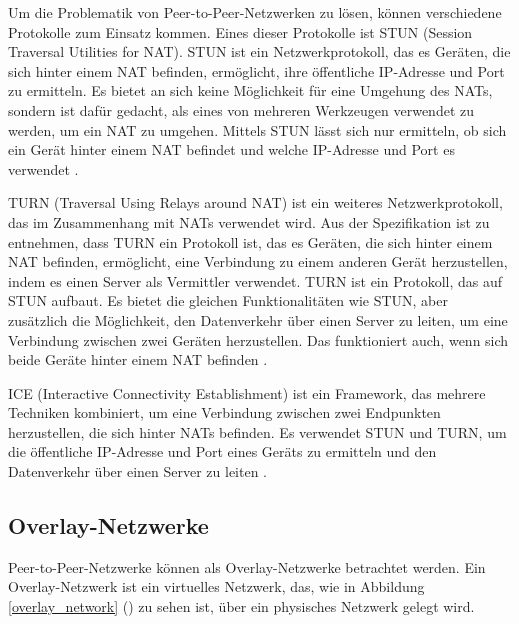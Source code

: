 Um die Problematik von Peer-to-Peer-Netzwerken zu lösen, können verschiedene Protokolle zum Einsatz kommen. Eines dieser Protokolle ist STUN (Session Traversal Utilities for NAT). STUN ist ein Netzwerkprotokoll, das es Geräten, die sich hinter einem NAT befinden, ermöglicht, ihre öffentliche IP-Adresse und Port zu ermitteln. Es bietet an sich keine Möglichkeit für eine Umgehung des NATs, sondern ist dafür gedacht, als eines von mehreren Werkzeugen verwendet zu werden, um ein NAT zu umgehen. Mittels STUN lässt sich nur ermitteln, ob sich ein Gerät hinter einem NAT befindet und welche IP-Adresse und Port es verwendet \parencite[S. 4]{rfc8489_STUN}.

TURN (Traversal Using Relays around NAT) ist ein weiteres Netzwerkprotokoll, das im Zusammenhang mit NATs verwendet wird. Aus der Spezifikation ist zu entnehmen, dass TURN ein Protokoll ist, das es Geräten, die sich hinter einem NAT befinden, ermöglicht, eine Verbindung zu einem anderen Gerät herzustellen, indem es einen Server als Vermittler verwendet. TURN ist ein Protokoll, das auf STUN aufbaut. Es bietet die gleichen Funktionalitäten wie STUN, aber zusätzlich die Möglichkeit, den Datenverkehr über einen Server zu leiten, um eine Verbindung zwischen zwei Geräten herzustellen. Das funktioniert auch, wenn sich beide Geräte hinter einem NAT befinden \parencite[S. 7]{rfc8656_TURN}.

ICE (Interactive Connectivity Establishment) ist ein Framework, das mehrere Techniken kombiniert, um eine Verbindung zwischen zwei Endpunkten herzustellen, die sich hinter NATs befinden. Es verwendet STUN und TURN, um die öffentliche IP-Adresse und Port eines Geräts zu ermitteln und den Datenverkehr über einen Server zu leiten \Parencite[S. 6]{rfc8445_ICE}.


\subsection{Overlay-Netzwerke}

Peer-to-Peer-Netzwerke können als Overlay-Netzwerke betrachtet werden. Ein Overlay-Netzwerk ist ein virtuelles Netzwerk, das, wie in Abbildung \ref{overlay_network} (\textit{}) zu sehen ist, über ein physisches Netzwerk gelegt wird.

